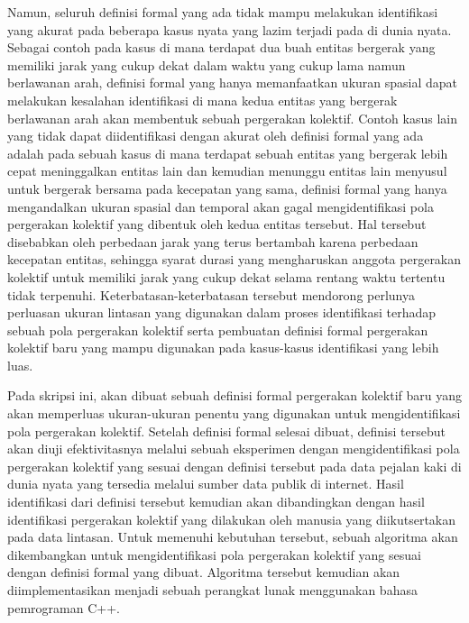Namun, seluruh definisi formal yang ada tidak mampu melakukan identifikasi yang akurat pada beberapa kasus nyata yang lazim terjadi pada di dunia nyata. Sebagai contoh pada kasus di mana terdapat dua buah entitas bergerak yang memiliki jarak yang cukup dekat dalam waktu yang cukup lama namun berlawanan arah, definisi formal yang hanya memanfaatkan ukuran spasial dapat melakukan kesalahan identifikasi di mana kedua entitas yang bergerak berlawanan arah akan membentuk sebuah pergerakan kolektif. Contoh kasus lain yang tidak dapat diidentifikasi dengan akurat oleh definisi formal yang ada adalah pada sebuah kasus di mana terdapat sebuah entitas yang bergerak lebih cepat meninggalkan entitas lain dan kemudian menunggu entitas lain menyusul untuk bergerak bersama pada kecepatan yang sama, definisi formal yang hanya mengandalkan ukuran spasial dan temporal akan gagal mengidentifikasi pola pergerakan kolektif yang dibentuk oleh kedua entitas tersebut. Hal tersebut disebabkan oleh perbedaan jarak yang terus bertambah karena perbedaan kecepatan entitas, sehingga syarat durasi yang mengharuskan anggota pergerakan kolektif untuk memiliki jarak yang cukup dekat selama rentang waktu tertentu tidak terpenuhi. \iffalse \lionov{tambah sedikit penjelasan kenapa gagal, bagusnya sih buat dua ini ditambah ilustrasi} \cristopher{Gambar rencananya sih ditambahin di bab 3 ko, kalo gitu ajah gimana?}. \fi Keterbatasan-keterbatasan tersebut mendorong perlunya perluasan ukuran lintasan yang digunakan dalam proses identifikasi terhadap sebuah pola pergerakan kolektif serta pembuatan definisi formal pergerakan kolektif baru yang mampu digunakan pada kasus-kasus identifikasi yang lebih luas. 

Pada skripsi ini, akan dibuat sebuah definisi formal pergerakan kolektif baru yang akan memperluas ukuran-ukuran penentu yang digunakan untuk mengidentifikasi pola pergerakan kolektif. Setelah definisi formal selesai dibuat, definisi tersebut akan diuji efektivitasnya melalui sebuah eksperimen dengan mengidentifikasi pola pergerakan kolektif yang sesuai dengan definisi tersebut pada data pejalan kaki di dunia nyata yang tersedia melalui sumber data publik di internet. Hasil identifikasi dari definisi tersebut kemudian akan dibandingkan dengan hasil identifikasi pergerakan kolektif yang dilakukan oleh manusia yang diikutsertakan pada data lintasan. Untuk memenuhi kebutuhan tersebut, sebuah algoritma akan dikembangkan untuk mengidentifikasi pola pergerakan kolektif yang sesuai dengan definisi formal yang dibuat. Algoritma tersebut kemudian akan diimplementasikan menjadi sebuah perangkat lunak menggunakan bahasa pemrograman C++.

